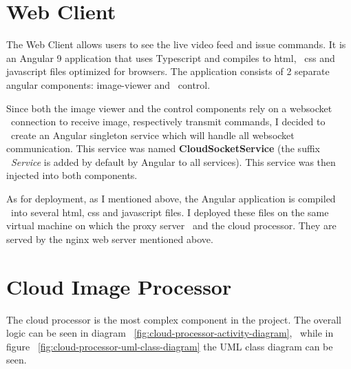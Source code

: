 \section{Web Client}
\label{sec:implementation-web-client}
The Web Client allows users to see the live video feed and issue commands.
It is an Angular 9 application that uses Typescript and compiles to html, \
css and javascript files optimized for browsers.
The application consists of 2 separate angular components: image-viewer and \
control.

Since both the image viewer and the control components rely on a websocket \
connection to receive image, respectively transmit commands, I decided to \
create an Angular singleton service which will handle all websocket communication.
This service was named \textbf{CloudSocketService} (the suffix \
\textit{Service} is added by default by Angular to all services).
This service was then injected into both components.

As for deployment, as I mentioned above, the Angular application is compiled \
into several html, css and javascript files.
I deployed these files on the same virtual machine on which the proxy server \
and the cloud processor.
They are served by the nginx web server mentioned above.


\section{Cloud Image Processor}
\label{sec:implementation-cloud-processor}
The cloud processor is the most complex component in the project.
The overall logic can be seen in diagram ~\ref{fig:cloud-processor-activity-diagram}, \
while in figure ~\ref{fig:cloud-processor-uml-class-diagram} the UML class diagram can be seen.


